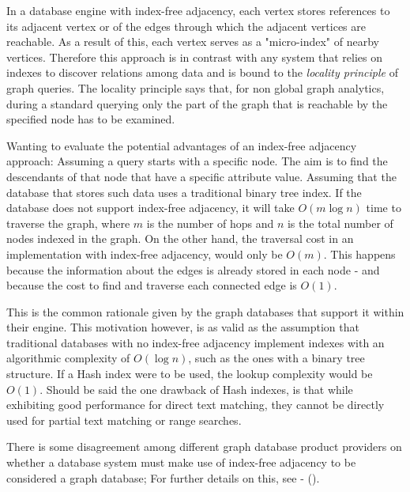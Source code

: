 In a database engine with index-free adjacency, each vertex stores references to its adjacent vertex or of the edges through which the adjacent vertices are reachable.
As a result of this, each vertex serves as a "micro-index" of nearby vertices.
Therefore this approach is in contrast with any system that relies on indexes to discover relations among data and is bound to the \textit{locality principle} of graph queries.
The locality principle says that, for non global graph analytics, during a standard querying only the part of the graph that is reachable by the specified node has to be examined.

Wanting to evaluate the potential advantages of an index-free adjacency approach:
Assuming a query starts with a specific node.
The aim is to find the descendants of that node that have a specific attribute value.
Assuming that the database that stores such data uses a traditional binary tree index.
If the database does not support index-free adjacency, it will take $ O \left(m \log n \right) $ time to traverse the graph, where $ m $ is the number of hops and $ n $ is the total number of nodes indexed in the graph.
On the other hand, the traversal cost in an implementation with index-free adjacency, would only be $ O \left( m \right) $.
This happens because the information about the edges is already stored in each node - and because the cost to find and traverse each connected edge is $ O \left( 1 \right) $.

This is the common rationale given by the graph databases that support it within their engine.
This motivation however, is as valid as the assumption that traditional databases with no index-free adjacency implement indexes with an algorithmic complexity of $ O \left( \log n \right) $, such as the ones with a binary tree structure.
If a Hash index were to be used, the lookup complexity would be $ O \left( 1 \right) $.
Should be said the one drawback of Hash indexes, is that while exhibiting good performance for direct text matching, they cannot be directly used for partial text matching or range searches.

There is some disagreement among different graph database product providers on whether a database system must make use of index-free adjacency to be considered a graph database;
For further details on this, see  - \citeauthor{ArangoDBWeinbergerIndexFree2016} (\citeyear{ArangoDBWeinbergerIndexFree2016}).

